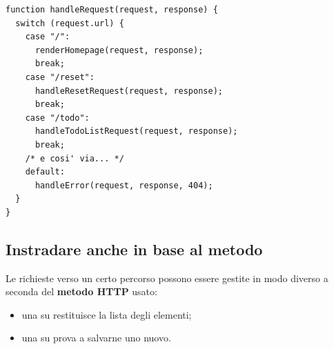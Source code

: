 \begin{affianco}[0.5][c]
\begin{lstlisting}[style=js, name=router.js]
function handleRequest(request, response) {
  switch (request.url) {
    case "/":
      renderHomepage(request, response);
      break;
    case "/reset":
      handleResetRequest(request, response);
      break;
    case "/todo":
      handleTodoListRequest(request, response);
      break;
    /* e cosi' via... */
    default:
      handleError(request, response, 404);
  }
}
\end{lstlisting}
\risultato
\begin{immagine}
\end{immagine}
\end{affianco}

\subsection{Instradare anche in base al metodo}

Le richieste verso un certo percorso possono essere gestite in modo diverso a
seconda del \textbf{metodo HTTP} usato:

\begin{itemize}
  \item una  su  restituisce la lista degli elementi;
  \item una  su  prova a salvarne uno nuovo.
\end{itemize}

